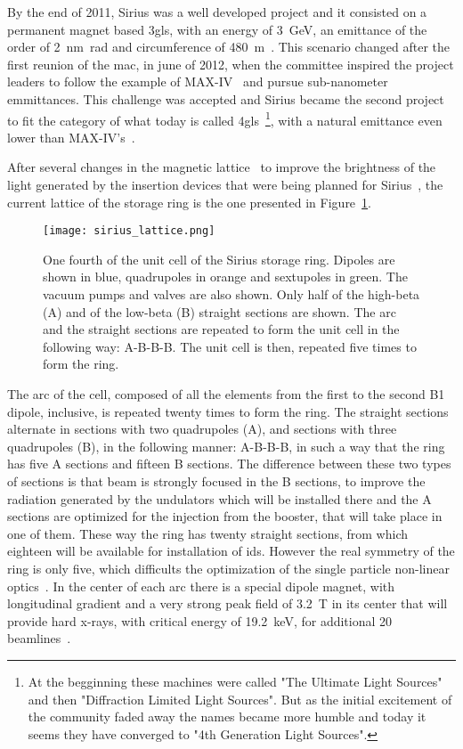     By the end of 2011, Sirius was a well developed project and it consisted on a permanent magnet based \gls{3gls}, with an energy of \SI{3}{\giga\electronvolt}, an emittance of the order of \SI{2}{\nano\meter\radian} and circumference of \SI{480}{\meter}~\cite{SiriusAntigo}. This scenario changed after the first reunion of the \gls{mac}, in june of 2012, when the committee inspired the project leaders to follow the example of MAX-IV~\cite{MaxIVfirst} and pursue sub-nanometer emmittances. This challenge was accepted and Sirius became the second project to fit the category of what today is called \gls{4gls}~\footnote{At the begginning these machines were called "The Ultimate Light Sources" and then "Diffraction Limited Light Sources". But as the initial excitement of the community faded away the names became more humble and today it seems they have converged to "4th Generation Light Sources".}, with a natural emittance even lower than MAX-IV's~\cite{FirstSirius}.

    After several changes in the magnetic lattice~\cite{ipac2014,ipac2015} to improve the brightness of the light generated by the insertion devices that were being planned for Sirius~\cite{wikisirius,luana}, the current lattice of the storage ring is the one presented in Figure~\ref{fig:sirius_lattice}.
    \begin{figure}[t!]
        \center
        \texttt{[image: sirius\_lattice.png]}
        \caption[One fourth of the unit cell of the Sirius storage ring.]{One fourth of the unit cell of the Sirius storage ring. Dipoles are shown in blue, quadrupoles in orange and sextupoles in green. The vacuum pumps and valves are also shown. Only half of the high-beta (A) and of the low-beta (B) straight sections are shown. The arc and the straight sections are repeated to form the unit cell in the following way: A-B-B-B. The unit cell is then, repeated five times to form the ring.}
        \label{fig:sirius_lattice}
    \end{figure}
    The arc of the cell, composed of all the elements from the first to the second B1 dipole, inclusive, is repeated twenty times to form the ring. The straight sections alternate in sections with two quadrupoles (A), and sections with three quadrupoles (B), in the following manner: A-B-B-B, in such a way that the ring has five A sections and fifteen B sections. The difference between these two types of sections is that beam is strongly focused in the B sections, to improve the radiation generated by the undulators which will be installed there and the A sections are optimized for the injection from the booster, that will take place in one of them. These way the ring has twenty straight sections, from which eighteen will be available for installation of \gls{ids}. However the real symmetry of the ring is only five, which difficults the optimization of the single particle non-linear optics~\cite{Sa2016, Dester2017}. In the center of each arc there is a special dipole magnet, with longitudinal gradient and a very strong peak field of \SI{3.2}{\tesla} in its center that will provide hard x-rays, with critical energy of \SI{19.2}{\kilo\electronvolt}, for additional 20 beamlines~\cite{Liu2016, wikisirius}.


